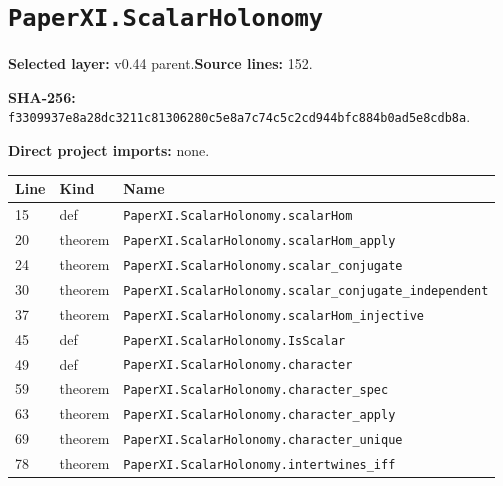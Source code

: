\documentclass[10pt,oneside]{book}
\begin{document}
\section{\texorpdfstring{\nolinkurl{PaperXI.ScalarHolonomy}}{PaperXI.ScalarHolonomy}}\label{module:PaperXI.ScalarHolonomy}

\textbf{Selected layer:} v0.44 parent.\quad\textbf{Source lines:} 152.\par\textbf{SHA-256:} {\scriptsize\nolinkurl{f3309937e8a28dc3211c81306280c5e8a7c74c5c2cd944bfc884b0ad5e8cdb8a}}.


\textbf{Direct project imports:} none.

\begin{longtable}{@{}p{}p{}p{}@{}}\toprule Line&Kind&Name\\\midrule\endhead

15&def&\nolinkurl{PaperXI.ScalarHolonomy.scalarHom}\\

20&theorem&\nolinkurl{PaperXI.ScalarHolonomy.scalarHom_apply}\\

24&theorem&\nolinkurl{PaperXI.ScalarHolonomy.scalar_conjugate}\\

30&theorem&\nolinkurl{PaperXI.ScalarHolonomy.scalar_conjugate_independent}\\

37&theorem&\nolinkurl{PaperXI.ScalarHolonomy.scalarHom_injective}\\

45&def&\nolinkurl{PaperXI.ScalarHolonomy.IsScalar}\\

49&def&\nolinkurl{PaperXI.ScalarHolonomy.character}\\

59&theorem&\nolinkurl{PaperXI.ScalarHolonomy.character_spec}\\

63&theorem&\nolinkurl{PaperXI.ScalarHolonomy.character_apply}\\

69&theorem&\nolinkurl{PaperXI.ScalarHolonomy.character_unique}\\

78&theorem&\nolinkurl{PaperXI.ScalarHolonomy.intertwines_iff}\\


\end{longtable}
\end{document}
